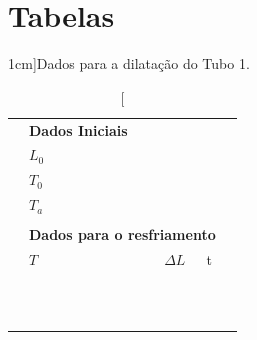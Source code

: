 \vfill
\pagebreak
\section{Tabelas}
\begin{table}[!ht]
\caption[][1cm]{Dados para a dilatação do Tubo 1.}
\label{Tab:DadosTubo1}
\centering
	\begin{tabular}{lllll}
		\toprule
		&\textbf{Dados Iniciais}\\
		\cmidrule{2-3}
		& \cellcolor[gray]{0.89}$L_0$ &\cellcolor[gray]{0.92}\\
		& \cellcolor[gray]{0.95}$T_0$ & \cellcolor[gray]{0.97}\\
		& \cellcolor[gray]{0.89}$T_a$ & \cellcolor[gray]{0.92}\\
		\cmidrule{2-3}
\\
		&\multicolumn{3}{l}{\textbf{Dados para o resfriamento}} \\
		\cmidrule{2-4}
		& $T$ & $\Delta L$ & t &\\
		\cmidrule{2-4}
		& \cellcolor[gray]{0.89} \phantom{xxxxxxxxxxxxxxxxxxxx}& \cellcolor[gray]{0.92} \phantom{xxxxxxxxxxxxxxxxxxxx} &  \cellcolor[gray]{0.89} \phantom{xxxxxxxxxxxxxxxxxxxx} \\
		& \cellcolor[gray]{0.95} & \cellcolor[gray]{0.97} & \cellcolor[gray]{0.95} \\
		& \cellcolor[gray]{0.89} & \cellcolor[gray]{0.92} & \cellcolor[gray]{0.89} \\
		& \cellcolor[gray]{0.95} & \cellcolor[gray]{0.97} & \cellcolor[gray]{0.95} \\
		& \cellcolor[gray]{0.89} & \cellcolor[gray]{0.92} & \cellcolor[gray]{0.89} \\
		& \cellcolor[gray]{0.95} & \cellcolor[gray]{0.97} & \cellcolor[gray]{0.95} \\
		& \cellcolor[gray]{0.89} & \cellcolor[gray]{0.92} & \cellcolor[gray]{0.89} \\
		& \cellcolor[gray]{0.95} & \cellcolor[gray]{0.97} & \cellcolor[gray]{0.95} \\
		& \cellcolor[gray]{0.89} & \cellcolor[gray]{0.92} & \cellcolor[gray]{0.89} \\
		& \cellcolor[gray]{0.95} & \cellcolor[gray]{0.97} & \cellcolor[gray]{0.95} \\
		& \cellcolor[gray]{0.89} & \cellcolor[gray]{0.92} & \cellcolor[gray]{0.89} \\

\end{tabular}
\end{table}

